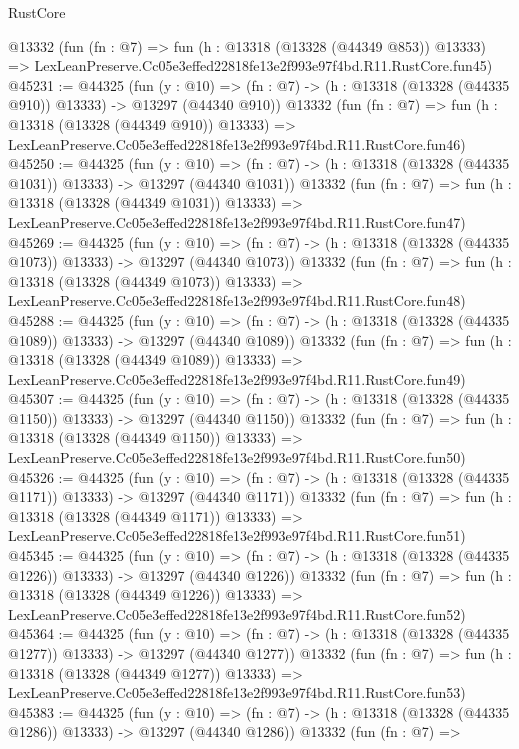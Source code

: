 \begin{lexlean}{RustCore}
\begin{coremodule}
    @13332
    (fun (fn : @7) =>
    fun (h : @13318 (@13328 (@44349 @853)) @13333) =>
    LexLeanPreserve.Cc05e3effed22818fe13e2f993e97f4bd.R11.RustCore.fun45)
@45231 := @44325
    (fun (y : @10) =>
    (fn : @7) -> (h : @13318 (@13328 (@44335 @910)) @13333) -> @13297 (@44340 @910))
    @13332
    (fun (fn : @7) =>
    fun (h : @13318 (@13328 (@44349 @910)) @13333) =>
    LexLeanPreserve.Cc05e3effed22818fe13e2f993e97f4bd.R11.RustCore.fun46)
@45250 := @44325
    (fun (y : @10) =>
    (fn : @7) -> (h : @13318 (@13328 (@44335 @1031)) @13333) -> @13297 (@44340 @1031))
    @13332
    (fun (fn : @7) =>
    fun (h : @13318 (@13328 (@44349 @1031)) @13333) =>
    LexLeanPreserve.Cc05e3effed22818fe13e2f993e97f4bd.R11.RustCore.fun47)
@45269 := @44325
    (fun (y : @10) =>
    (fn : @7) -> (h : @13318 (@13328 (@44335 @1073)) @13333) -> @13297 (@44340 @1073))
    @13332
    (fun (fn : @7) =>
    fun (h : @13318 (@13328 (@44349 @1073)) @13333) =>
    LexLeanPreserve.Cc05e3effed22818fe13e2f993e97f4bd.R11.RustCore.fun48)
@45288 := @44325
    (fun (y : @10) =>
    (fn : @7) -> (h : @13318 (@13328 (@44335 @1089)) @13333) -> @13297 (@44340 @1089))
    @13332
    (fun (fn : @7) =>
    fun (h : @13318 (@13328 (@44349 @1089)) @13333) =>
    LexLeanPreserve.Cc05e3effed22818fe13e2f993e97f4bd.R11.RustCore.fun49)
@45307 := @44325
    (fun (y : @10) =>
    (fn : @7) -> (h : @13318 (@13328 (@44335 @1150)) @13333) -> @13297 (@44340 @1150))
    @13332
    (fun (fn : @7) =>
    fun (h : @13318 (@13328 (@44349 @1150)) @13333) =>
    LexLeanPreserve.Cc05e3effed22818fe13e2f993e97f4bd.R11.RustCore.fun50)
@45326 := @44325
    (fun (y : @10) =>
    (fn : @7) -> (h : @13318 (@13328 (@44335 @1171)) @13333) -> @13297 (@44340 @1171))
    @13332
    (fun (fn : @7) =>
    fun (h : @13318 (@13328 (@44349 @1171)) @13333) =>
    LexLeanPreserve.Cc05e3effed22818fe13e2f993e97f4bd.R11.RustCore.fun51)
@45345 := @44325
    (fun (y : @10) =>
    (fn : @7) -> (h : @13318 (@13328 (@44335 @1226)) @13333) -> @13297 (@44340 @1226))
    @13332
    (fun (fn : @7) =>
    fun (h : @13318 (@13328 (@44349 @1226)) @13333) =>
    LexLeanPreserve.Cc05e3effed22818fe13e2f993e97f4bd.R11.RustCore.fun52)
@45364 := @44325
    (fun (y : @10) =>
    (fn : @7) -> (h : @13318 (@13328 (@44335 @1277)) @13333) -> @13297 (@44340 @1277))
    @13332
    (fun (fn : @7) =>
    fun (h : @13318 (@13328 (@44349 @1277)) @13333) =>
    LexLeanPreserve.Cc05e3effed22818fe13e2f993e97f4bd.R11.RustCore.fun53)
@45383 := @44325
    (fun (y : @10) =>
    (fn : @7) -> (h : @13318 (@13328 (@44335 @1286)) @13333) -> @13297 (@44340 @1286))
    @13332
    (fun (fn : @7) =>

\end{coremodule}
\end{lexlean}
